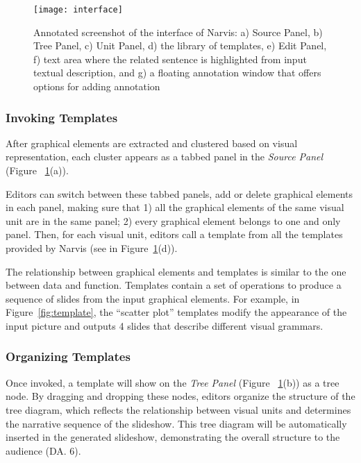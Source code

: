      
\begin{figure}
 \centering %
 \texttt{[image: interface]}
 \caption{Annotated screenshot of the interface of Narvis: a) Source Panel, b) Tree Panel, c) Unit Panel, d) the library of templates, e) Edit Panel, f) text area where the related sentence is highlighted from input textual description, and g) a floating annotation window that offers options for adding annotation}
 \label{fig:interface}
\end{figure}   


\subsubsection{Invoking Templates} 

After graphical elements are extracted and clustered based on visual representation, each cluster appears as a tabbed panel in the \textit{Source Panel} (Figure ~\ref{fig:interface}(a)). 

Editors can switch between these tabbed panels, add or delete graphical elements in each panel, making sure that 1) all the graphical elements of the same visual unit are in the same panel; 2) every graphical element belongs to one and only panel. Then, for each visual unit, editors call a template from all the templates provided by Narvis (see in Figure~\ref{fig:interface}(d)). 

The relationship between graphical elements and templates is similar to the one between data and function. Templates contain a set of operations to produce a sequence of slides from the input graphical elements. For example, in Figure~\ref{fig:template}, the ``scatter plot'' templates modify the appearance of the input picture and outputs 4 slides that describe different visual grammars. 

\subsubsection{Organizing Templates} 
Once invoked, a template will show on the \textit{Tree Panel} (Figure ~\ref{fig:interface}(b)) as a tree node. 
By dragging and dropping these nodes, editors organize the structure of the tree diagram, which reflects the relationship between visual units and determines the narrative sequence of the slideshow. This tree diagram will be automatically inserted in the generated slideshow, demonstrating the overall structure to the audience (DA. 6). 

